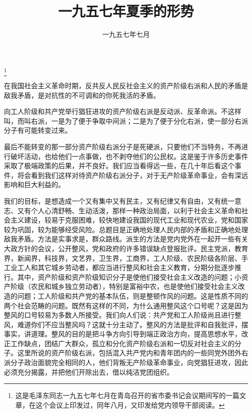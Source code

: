 
\title{一九五七年夏季的形势}
\date{一九五七年七月}
\thanks{这是毛泽东同志一九五七年七月在青岛召开的省市委书记会议期间写的一篇文章，在这个会议上印发过，同年八月，又印发给党内领导干部阅读。}
\maketitle


在我国社会主义革命时期，反共反人民反社会主义的资产阶级右派和人民的矛盾是敌我矛盾，是对抗性的不可调和的你死我活的矛盾。

向工人阶级和共产党举行猖狂进攻的资产阶级右派是反动派、反革命派。不这样叫，而叫右派，一是为了便于争取中间派；二是为了便于分化右派，使一部分右派分子有可能转变过来。

最后不能转变的那一部分资产阶级右派分子是死硬派，只要他们不当特务，不再进行破坏活动，也给他们一点事做，也不剥夺他们的公民权。这是鉴于许多历史事件采取了极端政策的后果，并不良好。我们应当看得远一些，在几十年后看这个事件，将会看到我们这样对待资产阶级右派分子，对于无产阶级革命事业，会有深远影响和巨大利益的。

我们的目标，是想造成一个又有集中又有民主，又有纪律又有自由，又有统一意志、又有个人心清舒畅、生动活泼，那样一种政治局面，以利于社会主义革命和社会主义建设，较易于克服困难，较快地建设我国的现代工业和现代农业，党和国家较为巩固，较为能够经受风险。总题目是正确地处理人民内部的矛盾和正确地处理敌我矛盾。方法是实事求是，群众路线。派生的方法是党内党外在一起开一些有关大政方针的会议，公开整风，党和政府的许多错误缺点登报批评。民主党派，教育界，新闻界，科技界，文艺界，卫生界，工商界，工人阶级、农民阶级各阶层、手工业工人和其它城乡劳动者，都应当进行整风和社会主义教育，分期分批逐步推行。其中，资产阶级和资产阶级知识分子是使他们接受社会主义改造的问题；小资产阶级（农民和城乡独立劳动者），特别是富裕中农，也是使他们接受社会主义改造的问题；工人阶级和共产党的基本队伍，则是整顿作风的问题。这是性质不同的两个社会范畴的问题。既然有这样的不同，为什么通用整风这个口号呢？这是因为整风的口号较易为多数人所接受。我们向人们说：共产党和工人阶级尚且进行整风，难道你们不应当整风吗？这就十分主动了。整风的方法是批评和自我批评，摆事实，讲道理。整风的目的是把斗争方向引导到端正政治方向，提高思想水平，改正工作缺点，团结广大群众，孤立和分化资产阶级右派和一切反对社会主义的分子。这里所说的资产阶级右派，包括混入共产党内和青年团内的一些同党外团外右派分子政治面貌完全相同的人，他们背叛无产阶级革命事业，向党猖狂进攻，因此必须充分揭露，并把他们开除出去，借以纯洁党团组织。

